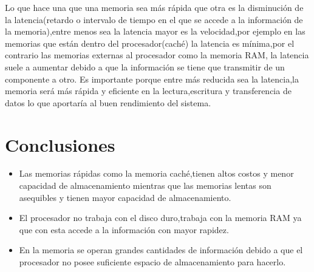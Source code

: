 \documentclass{article}
\begin{document}
Lo que hace una que una memoria sea más rápida que otra es la disminución de la latencia(retardo o intervalo de tiempo en el que se  accede a la información de la memoria),entre menos sea la latencia mayor es la velocidad,por ejemplo en las memorias que están dentro del procesador(caché) la latencia es mínima,por el contrario las memorias externas al  procesador como la memoria RAM,  la latencia suele a aumentar debido a que  la información se tiene que transmitir de un componente a otro. 
Es importante  porque entre más reducida sea la latencia,la memoria será más rápida y eficiente en la lectura,escritura y transferencia de datos lo que aportaría al buen rendimiento del sistema. 




\section{Conclusiones}
\begin{itemize}
    \item{Las memorias  rápidas como la memoria caché,tienen altos costos y menor capacidad de almacenamiento mientras que las memorias lentas son asequibles y tienen mayor capacidad de almacenamiento. }
    \item{El procesador no trabaja con el disco duro,trabaja con la memoria RAM ya que con esta  accede a la información con mayor rapidez.}
    \item{En la memoria se operan grandes cantidades de información debido a que el procesador no posee suficiente espacio de almacenamiento para hacerlo. }
\end{itemize}




\newpage
    




\end{document}
